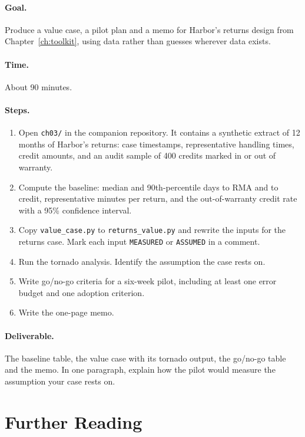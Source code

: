 \paragraph{Goal.} Produce a value case, a pilot plan and a memo for Harbor's returns design from Chapter~\ref{ch:toolkit}, using data rather than guesses wherever data exists.

\paragraph{Time.} About 90 minutes.

\paragraph{Steps.}
\begin{enumerate}[itemsep=2pt]
  \item Open \texttt{ch03/} in the companion repository. It contains a synthetic extract of 12 months of Harbor's returns: case timestamps, representative handling times, credit amounts, and an audit sample of 400 credits marked in or out of warranty.
  \item Compute the baseline: median and 90th-percentile days to RMA and to credit, representative minutes per return, and the out-of-warranty credit rate with a 95\% confidence interval.
  \item Copy \texttt{value\_case.py} to \texttt{returns\_value.py} and rewrite the inputs for the returns case. Mark each input \texttt{MEASURED} or \texttt{ASSUMED} in a comment.
  \item Run the tornado analysis. Identify the assumption the case rests on.
  \item Write go/no-go criteria for a six-week pilot, including at least one error budget and one adoption criterion.
  \item Write the one-page memo.
\end{enumerate}

\paragraph{Deliverable.} The baseline table, the value case with its tornado output, the go/no-go table and the memo. In one paragraph, explain how the pilot would measure the assumption your case rests on.

\section*{Further Reading}


